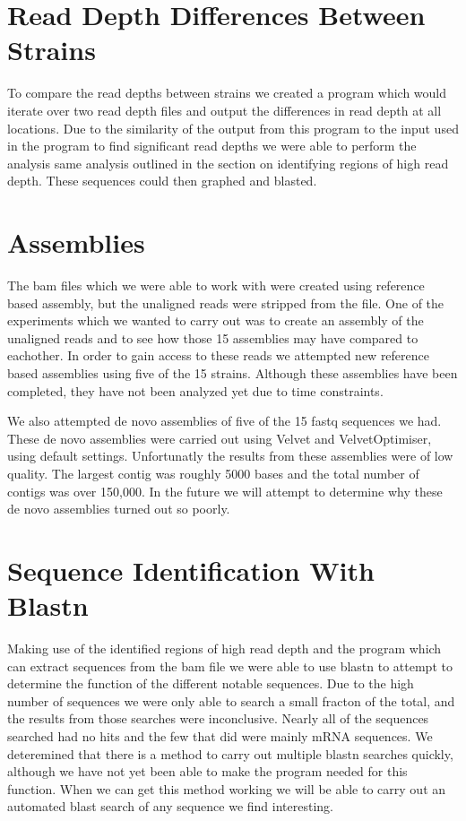 \documentclass[12pt]{article}
\begin{document}
%
%
\section{Read Depth Differences Between Strains}
	To compare the read depths between strains we created a program which would iterate over two read depth files and output the differences in read depth at all locations. Due to the similarity of the output from this program to the input used in the program to find significant read depths we were able to perform the analysis same analysis outlined in the section on identifying regions of high read depth. These sequences could then graphed and blasted.

%
%
\section{Assemblies}
	The bam files which we were able to work with were created using reference based assembly, but the unaligned reads were stripped from the file. One of the experiments which we wanted to carry out was to create an assembly of the unaligned reads and to see how those 15 assemblies may have compared to eachother. In order to gain access to these reads we attempted new reference based assemblies using five of the 15 strains. Although these assemblies have been completed, they have not been analyzed yet due to time constraints.

	We also attempted de novo assemblies of five of the 15 fastq sequences we had. These de novo assemblies were carried out using Velvet and VelvetOptimiser, using default settings. Unfortunatly the results from these assemblies were of low quality. The largest contig was roughly 5000 bases and the total number of contigs was over 150,000. In the future we will attempt to determine why these de novo assemblies turned out so poorly.

%
%
\section{Sequence Identification With Blastn}
	Making use of the identified regions of high read depth and the program which can extract sequences from the bam file we were able to use blastn to attempt to determine the function of the different notable sequences. Due to the high number of sequences we were only able to search a small fracton of the total, and the results from those searches were inconclusive. Nearly all of the sequences searched had no hits and the few that did were mainly mRNA sequences. We deteremined that there is a method to carry out multiple blastn searches quickly, although we have not yet been able to make the program needed for this function. When we can get this method working we will be able to carry out an automated blast search of any sequence we find interesting.   
\end{document}
